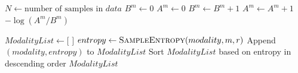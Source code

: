 \begin{algorithm}

\caption{ Ranking Modalities Based on SampEn}
\begin{algorithmic}
    \State $N \gets \text{number of samples in } data$
    \State $B^m \gets 0$
    \State $A^m \gets 0$
                \State $B^m \gets B^m + 1$
                    \State $A^m \gets A^m + 1$
                \EndIf
            \EndIf
        \EndFor
    \EndFor
    \State \Return $-\log(A^m / B^m)$ 
\EndFunction

\Statex

    \State $ModalityList \gets \text{[ ]}$
        \State $entropy \gets \Call{SampleEntropy}{modality, m, r}$
        \State Append $(modality, entropy)$ to $ModalityList$
    \EndFor
    \State Sort $ModalityList$ based on entropy in descending order
    \State \Return $ModalityList$ 
\EndFunction
\end{algorithmic}
\end{algorithm}